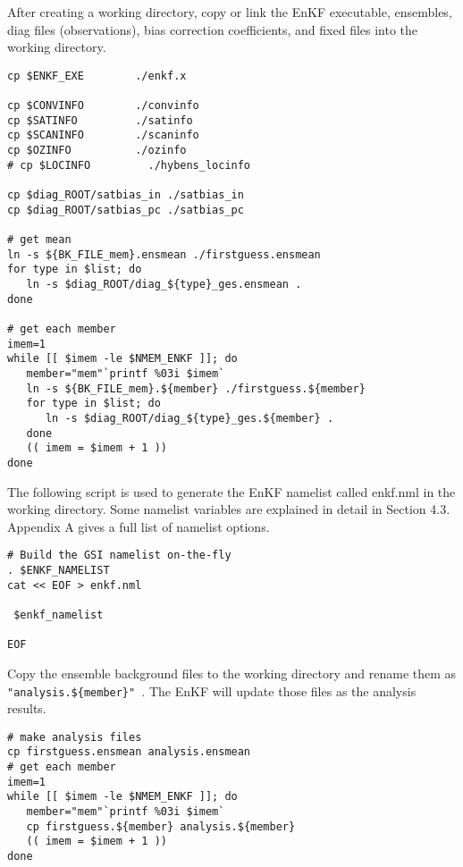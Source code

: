 After creating a working directory, copy or link the EnKF executable, ensembles, diag files (observations), bias correction coefficients, and fixed files into the working directory.
\begin{scriptsize}
\begin{verbatim}
cp $ENKF_EXE        ./enkf.x

cp $CONVINFO        ./convinfo
cp $SATINFO         ./satinfo
cp $SCANINFO        ./scaninfo
cp $OZINFO          ./ozinfo
# cp $LOCINFO         ./hybens_locinfo

cp $diag_ROOT/satbias_in ./satbias_in
cp $diag_ROOT/satbias_pc ./satbias_pc

# get mean
ln -s ${BK_FILE_mem}.ensmean ./firstguess.ensmean
for type in $list; do
   ln -s $diag_ROOT/diag_${type}_ges.ensmean .
done

# get each member
imem=1
while [[ $imem -le $NMEM_ENKF ]]; do
   member="mem"`printf %03i $imem`
   ln -s ${BK_FILE_mem}.${member} ./firstguess.${member}
   for type in $list; do
      ln -s $diag_ROOT/diag_${type}_ges.${member} .
   done
   (( imem = $imem + 1 ))
done
\end{verbatim}
\end{scriptsize}

The following script is used to generate the EnKF namelist called enkf.nml in the working directory. Some namelist variables are explained in detail in Section 4.3. Appendix A gives a full list of namelist options.
\begin{scriptsize}
\begin{verbatim}
# Build the GSI namelist on-the-fly
. $ENKF_NAMELIST
cat << EOF > enkf.nml

 $enkf_namelist

EOF
\end{verbatim}
\end{scriptsize}

Copy the ensemble background files to the working directory and rename them as \verb| "analysis.${member}" |. The EnKF will update those files as the analysis results.

\begin{scriptsize}
\begin{verbatim}
# make analysis files
cp firstguess.ensmean analysis.ensmean
# get each member
imem=1
while [[ $imem -le $NMEM_ENKF ]]; do
   member="mem"`printf %03i $imem`
   cp firstguess.${member} analysis.${member}
   (( imem = $imem + 1 ))
done
\end{verbatim}
\end{scriptsize}

